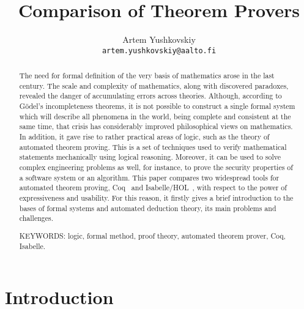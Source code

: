 \documentclass[article]{aaltoseries}
\begin{document}


\title{Comparison of Theorem Provers}

\author{Artem Yushkovskiy
\\\textnormal{\texttt{artem.yushkovskiy@aalto.fi}}}


\maketitle



\begin{abstract}

The need for formal definition of the very basis of mathematics arose in the last century.
The scale and complexity of mathematics, along with discovered paradoxes, revealed the danger of accumulating errors across theories. Although, according to Gödel's incompleteness theorems, it is not possible to construct a single formal system which will describe all phenomena in the world, being complete and consistent at the same time, that crisis has considerably improved philosophical views on mathematics. 
In addition, it gave rise to rather practical areas of logic, such as the theory of automated theorem proving. This is a set of techniques used to verify mathematical statements mechanically using logical reasoning. Moreover, it can be used to solve complex engineering problems as well, for instance, to prove the security properties of a software system or an algorithm.
This paper compares two widespread tools for automated theorem proving, Coq~\cite{tool_Coq} and Isabelle/HOL~\cite{tool_Isabelle}, with respect to the power of expressiveness and usability. For this reason, it firstly gives a brief introduction to the bases of formal systems and automated deduction theory, its main problems and challenges.

\vspace{3mm}
\noindent KEYWORDS: logic, formal method, proof theory, automated theorem prover, Coq, Isabelle.
	
\end{abstract}



\section{Introduction}
\end{document}
